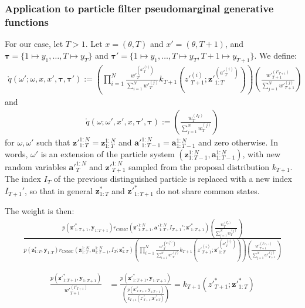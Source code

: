 \documentclass[11pt]{article}
\newcommand{\z}{\mathbf{z}}
\newcommand{\abold}{\mathbf{a}}
\newcommand{\y}{\mathbf{y}}
\newcommand\tdict[0]{\boldsymbol{\tau}}
\begin{document}
\subsubsection{Application to particle filter pseudomarginal generative functions}
For our case, let $T > 1$.
Let $x = (\theta, T)$ and $x' = (\theta, T+1)$, and 
$\tdict = \{1 \mapsto y_1, \ldots, T \mapsto y_T\}$ and 
$\tdict' = \{1 \mapsto y_1, \ldots, T \mapsto y_T, T + 1 \mapsto y_{T+1}\}$.
We define:
\begin{align*}
 \mathring{q}(\omega'; \omega, x, x', \tdict, \tdict')
    := \left( \prod_{i=1}^N \frac{{w'}_{T}^{({a'}_{T}^{(i)})}}{\sum_{i=1}^N {w'}_{T}^{(j)}} k_{T+1}({z'}_{T+1}^{(i)}; {\z'}_{1:T}^{({a'}_{T}^{(i)})} ) \right)
        \left( \frac{{w'}_{T+1}^{(I'_{T+1})}}{\sum_{j=1}^N {w'}_{T+1}^{(j)}} \right)
\end{align*}
and 
\begin{align*}
 \mathring{q}(\omega; \omega', x', x, \tdict', \tdict)
    := \left( \frac{{w}_{T}^{(I_{T})}}{\sum_{j=1}^N {w}_{T}^{(j)}} \right)
\end{align*}
for $\omega, \omega'$ such that
${\z'}_{1:T}^{1:N} = {\z}_{1:T}^{1:N}$ and 
${\abold'}_{1:T-1}^{1:N} = {\abold}_{1:T-1}^{1:N}$
and zero otherwise.
In words, $\omega'$ is an extension of the particle system $(\z_{1:T-1}^{1:N}, \abold_{1:T-1}^{1:N})$, with new random variables ${\abold'}_{T}^{1:N}$ and ${\z'}_{T+1}^{1:N}$ sampled from the proposal distribution $k_{T+1}$.
The index $I_T$ of the previous distinguished particle is replaced with a new index $I_{T+1}'$, so that in general $\z_{1:T}^{*}$ and ${\z'}_{1:T+1}^{*}$ do not share common states.

The weight is then:
\begin{align*}
\frac{
    p({\z'}_{1:T+1}^*, \y_{1:T+1})
    r_{\mathrm{CSMC}}({\z'}_{1:T+1}^{1:N}, {\abold'}_{1:T}^{1:N}, I_{T+1}'; {\z'}_{1:T+1}^*)
    \left( \frac{{w}_{T}^{(I_{T})}}{\sum_{j=1}^N {w}_{T}^{(j)}} \right)
}{
    p(\z_{1:T}^*, \y_{1:T})
    r_{\mathrm{CSMC}}(\z_{1:T}^{1:N}, \abold_{1:T-1}^{1:N}, I_T; \z_{1:T}^*)
    \left( \prod_{i=1}^N \frac{{w'}_{T}^{({a'}_{T}^{(i)})}}{\sum_{i=1}^N {w'}_{T}^{(j)}} k_{T+1}({z'}_{T+1}^{(i)}; {\z'}_{1:T}^{({a'}_{T}^{(i)})} ) \right)
    \left( \frac{{w'}_{T+1}^{(I'_{T+1})}}{\sum_{j=1}^N {w'}_{T+1}^{(j)}} \right)
}
\end{align*}

\begin{align*}
\frac{p({\z'}_{1:T+1}^*, \y_{1:T+1})}{{w'}_{T+1}^{(I'_{T+1})}}
    &= \frac{p({\z'}_{1:T+1}^*, \y_{1:T+1})}
            {\left(\frac{p({\z'}_{1:T+1}^*, \y_{1:T+1})}{k_{T+1}({z'}_{T+1}^{*}; {\z'}_{1:T}^{*})}\right)}
    = k_{T+1}({z'}_{T+1}^{*}; {\z'}_{1:T}^{*})
\end{align*}
\end{document}
